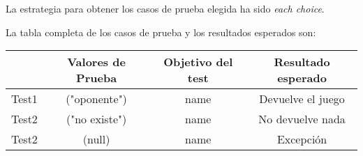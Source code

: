 La estrategia para obtener los casos de prueba elegida ha sido
\textit{each choice}.

La tabla completa de los casos de prueba y los resultados esperados son:

{\footnotesize
\begin{longtable}[c]{lccc}
 & \textbf{Valores de Prueba} & \textbf{Objetivo del test} & \textbf{Resultado esperado} \\
\hline \hline
\endhead

Test1 & ("oponente") & name & Devuelve el juego\\
Test2 & ("no existe") & name & No devuelve nada\\
Test2 & (null) & name & Excepci\'on\\

\hline
\end{longtable}
} 